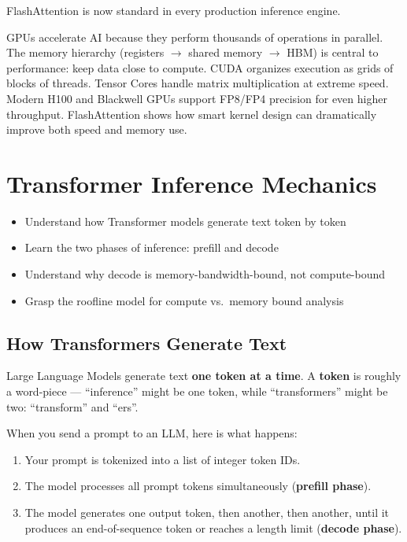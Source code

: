 \documentclass[11pt, twoside, openright]{book}
\newenvironment{learningobjectives}
  {\begin{tcolorbox}[enhanced, breakable,
    colback={rgb,255:red,232;green,240;blue,255},
    colframe=NavyBlue, boxrule=1.5pt, arc=4pt,
    title={\bfseries Learning Objectives},
    fonttitle=\bfseries\color{white},
    attach boxed title to top left={yshift=-2mm, xshift=5mm},
    boxed title style={colback=NavyBlue, arc=2pt}]
  \begin{itemize}[leftmargin=1.5em, itemsep=2pt]}
  {\end{itemize}\end{tcolorbox}}
\newenvironment{chapsummary}
  {\begin{tcolorbox}[enhanced, breakable,
    colback={rgb,255:red,245;green,245;blue,225},
    colframe=AccentOrange, boxrule=1.5pt, arc=4pt,
    title={\bfseries Chapter Summary},
    fonttitle=\bfseries\color{white},
    attach boxed title to top left={yshift=-2mm, xshift=5mm},
    boxed title style={colback=AccentOrange, arc=2pt}]}
  {\end{tcolorbox}}
\newcommand{\keyterm}[1]{\textbf{\color{AccentOrange}#1}}
\begin{document}
FlashAttention is now standard in every production inference engine.

\begin{chapsummary}
GPUs accelerate AI because they perform thousands of operations in parallel.
The memory hierarchy (registers $\to$ shared memory $\to$ HBM) is central to
performance: keep data close to compute.  CUDA organizes execution as grids of
blocks of threads.  Tensor Cores handle matrix multiplication at extreme speed.
Modern H100 and Blackwell GPUs support FP8/FP4 precision for even higher
throughput.  FlashAttention shows how smart kernel design can dramatically improve
both speed and memory use.
\end{chapsummary}

\chapter{Transformer Inference Mechanics}
\label{ch:transformer}

\begin{learningobjectives}
  \item Understand how Transformer models generate text token by token
  \item Learn the two phases of inference: prefill and decode
  \item Understand why decode is memory-bandwidth-bound, not compute-bound
  \item Grasp the roofline model for compute vs.\ memory bound analysis
\end{learningobjectives}

\section{How Transformers Generate Text}

Large Language Models generate text \textbf{one token at a time}.  A
\keyterm{token} is roughly a word-piece --- ``inference'' might be
one token, while ``transformers'' might be two: ``transform'' and ``ers''.

When you send a prompt to an LLM, here is what happens:

\begin{enumerate}
  \item Your prompt is tokenized into a list of integer token IDs.
  \item The model processes all prompt tokens simultaneously (\textbf{prefill phase}).
  \item The model generates one output token, then another, then another, until
        it produces an end-of-sequence token or reaches a length limit
        (\textbf{decode phase}).
\end{enumerate}
\end{document}
